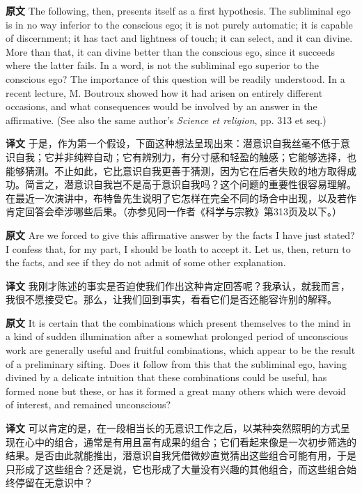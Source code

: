 \documentclass[UTF8,zihao=-4]{ctexart}
\newcommand{\BodyFont}{\fontsize{10.5pt}{15.5pt}\selectfont}
\newcommand{\origlabel}{\textbf{原文}\quad}
\newcommand{\translabel}{\textbf{译文}\quad}
\newenvironment{enblock}{\par\noindent\begingroup\BodyFont\origlabel}{\par\endgroup}
\newenvironment{zhblock}{\par\noindent\begingroup\BodyFont\translabel}{\par\endgroup\vspace{0.35em}}
\begin{document}
\begin{enblock}
The following, then, presents itself as a first hypothesis. The subliminal ego is in no way inferior to the conscious ego; it is not purely automatic; it is capable of discernment; it has tact and lightness of touch; it can select, and it can divine. More than that, it can divine better than the conscious ego, since it succeeds where the latter fails. In a word, is not the subliminal ego superior to the conscious ego? The importance of this question will be readily understood. In a recent lecture, M. Boutroux showed how it had arisen on entirely different occasions, and what consequences would be involved by an answer in the affirmative. (See also the same author's \emph{Science et religion}, pp. 313 et seq.)
\end{enblock}
\begin{zhblock}
于是，作为第一个假设，下面这种想法呈现出来：潜意识自我丝毫不低于意识自我；它并非纯粹自动；它有辨别力，有分寸感和轻盈的触感；它能够选择，也能够猜测。不止如此，它比意识自我更善于猜测，因为它在后者失败的地方取得成功。简言之，潜意识自我岂不是高于意识自我吗？这个问题的重要性很容易理解。在最近一次演讲中，布特鲁先生说明了它怎样在完全不同的场合中出现，以及若作肯定回答会牵涉哪些后果。（亦参见同一作者《科学与宗教》第313页及以下。）
\end{zhblock}

\begin{enblock}
Are we forced to give this affirmative answer by the facts I have just stated? I confess that, for my part, I should be loath to accept it. Let us, then, return to the facts, and see if they do not admit of some other explanation.
\end{enblock}
\begin{zhblock}
我刚才陈述的事实是否迫使我们作出这种肯定回答呢？我承认，就我而言，我很不愿接受它。那么，让我们回到事实，看看它们是否还能容许别的解释。\end{zhblock}

\begin{enblock}
It is certain that the combinations which present themselves to the mind in a kind of sudden illumination after a somewhat prolonged period of unconscious work are generally useful and fruitful combinations, which appear to be the result of a preliminary sifting. Does it follow from this that the subliminal ego, having divined by a delicate intuition that these combinations could be useful, has formed none but these, or has it formed a great many others which were devoid of interest, and remained unconscious?
\end{enblock}
\begin{zhblock}
可以肯定的是，在一段相当长的无意识工作之后，以某种突然照明的方式呈现在心中的组合，通常是有用且富有成果的组合；它们看起来像是一次初步筛选的结果。是否由此就能推出，潜意识自我凭借微妙直觉猜出这些组合可能有用，于是只形成了这些组合？还是说，它也形成了大量没有兴趣的其他组合，而这些组合始终停留在无意识中？\end{zhblock}
\end{document}
